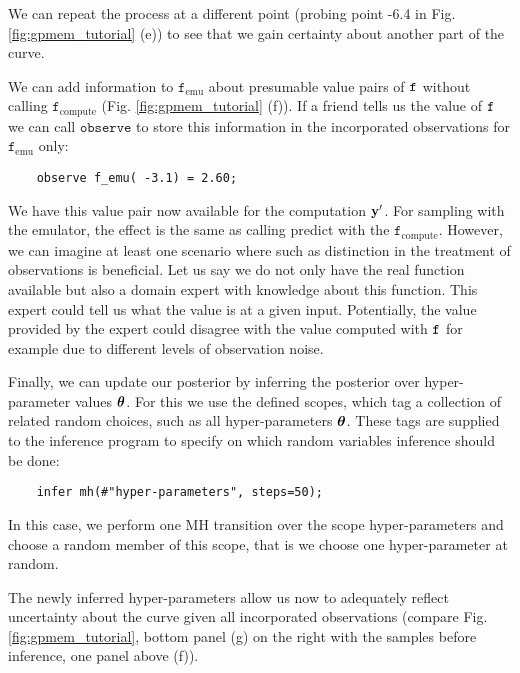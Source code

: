We can repeat the process at a different point (probing point -6.4 in Fig.
\ref{fig:gpmem_tutorial} (e)) to see that we gain certainty about another part of the curve. 

We can add information to $\texttt{f}_\text{emu}$ about presumable value pairs of $\texttt{f}$ without calling $\texttt{f}_\text{compute}$
(Fig. \ref{fig:gpmem_tutorial} (f)).
If a friend tells us the value of $\texttt{f}$ we can call $\texttt{observe}$ to store this information in the incorporated observations for $\texttt{f}_\text{emu}$ only:
    \begin{lstlisting}
    observe f_emu( -3.1) = 2.60;
    \end{lstlisting}
We have this value pair now available for the computation $\mathbf{y}^\prime$. 
For sampling with the emulator, the effect is the same as calling predict with the $\texttt{f}_\text{compute}$.
However, we can imagine at least one scenario where such as distinction in the treatment of observations 
is beneficial. Let us say we do not only have the real function available but also a domain expert with knowledge 
about this function.
This expert could tell us what the value is at a given input.
Potentially, the value provided by the expert could disagree with the value computed with $\texttt{f}$ for example 
due to different levels of observation noise. 

Finally, we can update our posterior by inferring the posterior over hyper-parameter values $\bm{\theta}$.
For this we use the defined scopes, which tag a collection of related random choices, such
as all hyper-parameters $\bm{\theta}$.
These tags are supplied to the
inference program to specify on which random variables inference
should be done:
    \begin{lstlisting}
    infer mh(#"hyper-parameters", steps=50);
    \end{lstlisting}
In this case, we perform one \ac{MH} transition over the scope hyper-parameters
and choose a random member of this scope, that is we choose one hyper-parameter at random.

The newly inferred hyper-parameters allow us now to adequately reflect uncertainty
about the curve given all incorporated observations (compare
Fig. \ref{fig:gpmem_tutorial}, bottom panel (g) on  the right with the samples
before inference, one panel above (f)).

